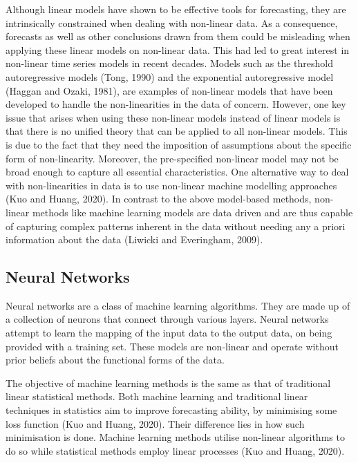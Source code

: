 Although linear models have shown to be effective tools for forecasting, they are intrinsically constrained when dealing with non-linear data. As a consequence, forecasts as well as other conclusions drawn from them could be misleading when applying these linear models on non-linear data. This had led to great interest in non-linear time series models in recent decades. Models such as the threshold autoregressive models (Tong, 1990) and the exponential autoregressive model (Haggan and Ozaki, 1981), are examples of non-linear models that have been developed to handle the non-linearities in the data of concern. However, one key issue that arises when using these non-linear models instead of linear models is that there is no unified theory that can be applied to all non-linear models. This is due to the fact that they need the imposition of assumptions about the specific form of non-linearity. Moreover, the pre-specified non-linear model may not be broad enough to capture all essential characteristics. One alternative way to deal with non-linearities in data is to use non-linear machine modelling approaches (Kuo and Huang, 2020). In contrast to the above model-based methods, non-linear methods like machine learning models are data driven and are thus capable of capturing complex patterns inherent in the data without needing any a priori information about the data (Liwicki and Everingham, 2009).


\subsection{Neural Networks}

Neural networks are a class of machine learning algorithms. They are made up of a collection of neurons that connect through various layers. Neural networks attempt to learn the mapping of the input data to the output data, on being provided with a training set. These models are non-linear and operate without prior beliefs about the functional forms of the data.

The objective of machine learning methods is the same as that of traditional linear statistical methods. Both machine learning and traditional linear techniques in statistics aim to improve forecasting ability, by minimising some loss function (Kuo and Huang, 2020). Their difference lies in how such minimisation is done. Machine learning methods utilise non-linear algorithms to do so while statistical methods employ linear processes (Kuo and Huang, 2020).  

